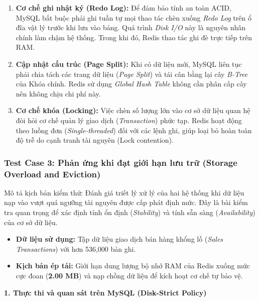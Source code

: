 \begin{enumerate}
    \item \textbf{Cơ chế ghi nhật ký (Redo Log):} Để đảm bảo tính an toàn ACID, MySQL bắt buộc phải ghi tuần tự mọi thao tác chèn xuống \textit{Redo Log} trên ổ đĩa vật lý trước khi lưu vào bảng. Quá trình \textit{Disk I/O} này là nguyên nhân chính làm chậm hệ thống. Trong khi đó, Redis thao tác ghi đè trực tiếp trên RAM.
    \item \textbf{Cập nhật cấu trúc (Page Split):} Khi có dữ liệu mới, MySQL liên tục phải chia tách các trang dữ liệu (\textit{Page Split}) và tái cân bằng lại cây \textit{B-Tree} của Khóa chính. Redis sử dụng \textit{Global Hash Table} không cần phân cấp cây nên không chịu chi phí này.
    \item \textbf{Cơ chế khóa (Locking):} Việc chèn số lượng lớn vào cơ sở dữ liệu quan hệ đòi hỏi cơ chế quản lý giao dịch (\textit{Transaction}) phức tạp. Redis hoạt động theo luồng đơn (\textit{Single-threaded}) đối với các lệnh ghi, giúp loại bỏ hoàn toàn độ trễ do cạnh tranh tài nguyên (Lock contention).
\end{enumerate}

\subsubsection{Test Case 3: Phản ứng khi đạt giới hạn lưu trữ (Storage Overload and Eviction)}

\leavevmode\par
\vspace{0.5em}

\noindent Mô tả kịch bản kiểm thử: Đánh giá triết lý xử lý của hai hệ thống khi dữ liệu nạp vào vượt quá ngưỡng tài nguyên được cấp phát định mức. Đây là bài kiểm tra quan trọng để xác định tính ổn định (\textit{Stability}) và tính sẵn sàng (\textit{Availability}) của cơ sở dữ liệu.

\begin{itemize}
\item \textbf{Dữ liệu sử dụng:} Tập dữ liệu giao dịch bán hàng khổng lồ (\textit{Sales Transactions}) với hơn 536,000 bản ghi.
\item \textbf{Kịch bản ép tải:} Giới hạn dung lượng bộ nhớ RAM của Redis xuống mức cực đoan (\textbf{2.00 MB}) và nạp chồng dữ liệu để kích hoạt cơ chế tự bảo vệ.
\end{itemize}

\vspace{0.5em}

\noindent\textbf{1. Thực thi và quan sát trên MySQL (Disk-Strict Policy)}

